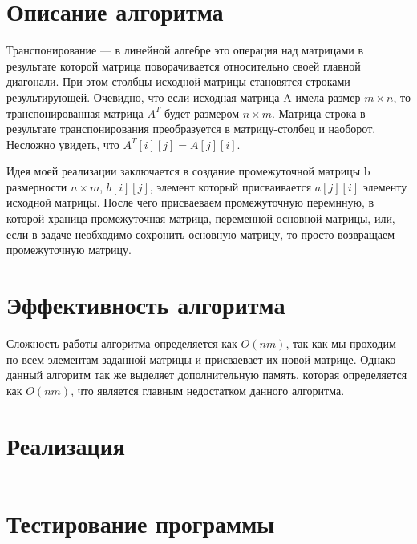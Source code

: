 \documentclass[spec, och, labwork]{shiza}
\begin{document}
\tableofcontents

\section{Описание алгоритма}

Транспонирование — в линейной алгебре это операция над матрицами в результате которой матрица 
поворачивается относительно своей главной диагонали. При этом столбцы исходной матрицы становятся 
строками результирующей.
Очевидно, что если исходная матрица A имела размер $m × n$, то транспонированная матрица $A^T$
будет размером $n × m$. Матрица-строка в результате транспонирования преобразуется в матрицу-столбец 
и наоборот. Несложно увидеть, что $A^T[i][j] = A[j][i]$.

Идея моей реализации заключается в создание промежуточной матрицы b размерности $n × m$, $b[i][j]$, 
элемент который присваивается $a[j][i]$ элементу исходной матрицы. После чего присваеваем промежуточную
перемнную, в которой храница промежуточная матрица, переменной основной матрицы, или, если в задаче 
необходимо сохронить основную матрицу, то просто возвращаем промежуточную матрицу.

\section{Эффективность алгоритма}

Сложность работы алгоритма определяется как $O(nm)$, так как мы проходим по всем элементам
заданной матрицы и присваевает их новой матрице. Однако данный алгоритм так же выделяет дополнительную
память, которая определяется как $O(nm)$, что является главным недостатком данного алгоритма.

\section{Реализация}

    \inputminted[fontsize=\small]{cpp}{lab3.cpp}

    \section{Тестирование программы}
\end{document}
